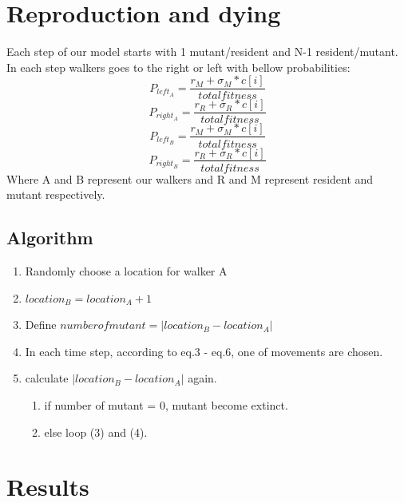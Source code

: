 \documentclass{article}
\begin{document}
\section{Reproduction and dying}
Each step of our model starts with 1 mutant/resident and N-1 resident/mutant. In each step walkers goes to the right or left with bellow probabilities:\\
\begin{equation}
    P_{left_A} = \frac{r_M+\sigma_M * c[i]}{total fitness}
\end{equation}
\begin{equation}
    P_{right_A} = \frac{r_R+\sigma_R * c[i]}{total fitness}
\end{equation}
\begin{equation}
    P_{left_B} = \frac{r_M+\sigma_M * c[i]}{total fitness}
\end{equation}
\begin{equation}
    P_{right_B} = \frac{r_R+\sigma_R * c[i]}{total fitness}
\end{equation}
Where A and B represent our walkers and R and M represent resident and mutant respectively. 
\subsection{Algorithm}
\begin{enumerate}
    \item Randomly choose a location for walker A
    \item $location_B = location_A + 1$
    \item Define $number of mutant = |location_B -location_A|$
    \item In each time step, according to eq.3 - eq.6, one of movements are chosen.
    \item calculate $|location_B -location_A|$ again.
    \begin{enumerate}
        \item if number of mutant = 0, mutant become extinct.
        \item else loop (3) and (4).
    \end{enumerate}
\end{enumerate}
\newpage
\section{Results}
\end{document}
